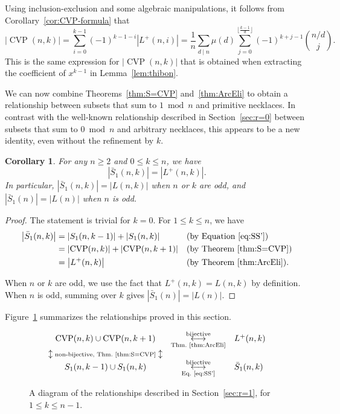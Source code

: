\documentclass[12pt]{article}
\DeclareMathOperator{\CVP}{CVP}
\newcommand{\card}[1]{\left|#1\right|}
\newcommand{\bS}{\bar{S}}
\newtheorem{corollary}[theorem]{Corollary}
\theoremstyle{definition}
\begin{document}
Using inclusion-exclusion and some algebraic manipulations, it follows from Corollary~\ref{cor:CVP-formula} that
$$\card{\CVP(n,k)}=\sum_{i=0}^{k-1}(-1)^{k-1-i}\card{L^+(n,i)}=\frac{1}{n}\sum_{d\mid n}\mu(d)\sum_{j=0}^{\lfloor\frac{k-1}{d}\rfloor}(-1)^{k+j-1}\binom{n/d}{j}.
$$
This is the same expression for $\card{\CVP(n,k)}$ that is obtained when extracting the coefficient of $x^{k-1}$ in Lemma~\ref{lem:thibon}.

We can now combine Theorems~\ref{thm:S=CVP} and~\ref{thm:ArcEli} to obtain a relationship between subsets that sum to $1 \bmod n$ and primitive necklaces. In contrast with the well-known relationship described in Section~\ref{sec:r=0} between subsets that sum to $0 \bmod n$ and arbitrary necklaces, this appears to be a new identity, even without the refinement by $k$.

\begin{corollary}\label{cor:S'1=L}
    For any $n\ge2$ and $0\le k\le n$, we have
    $$\card{\bS_1(n, k)} = \card{L^+(n, k)}.$$
    In particular, $\card{\bS_1(n, k)} = \card{L(n, k)}$ when $n$ or $k$ are odd, and $\card{\bS_1(n)} = \card{L(n)}$ when $n$ is odd.
\end{corollary}

\begin{proof}
The statement is trivial for $k=0$. For $1\le k\le n$, we have
\begin{align*}
    \card{\bS_1(n, k)}&=\card{S_1(n,k-1)}+\card{S_1(n,k)} && \text{(by Equation~\eqref{eq:SS'})}\\
    &=\card{\CVP(n,k)}+\card{\CVP(n,k+1)}  && \text{(by Theorem~\ref{thm:S=CVP})}\\
    &=\card{L^+(n,k)} && \text{(by Theorem~\ref{thm:ArcEli}).}
\end{align*}

When $n$ or $k$ are odd, we use the fact that $L^+(n,k)=L(n,k)$ by definition. When $n$ is odd, summing over $k$ gives $\card{\bS_1(n)} = \card{L(n)}$.
\end{proof}

Figure~\ref{fig:diagram} summarizes the relationships proved in this section.

\begin{figure}[h]
$$\begin{array}{cclc}
\CVP(n,k)\cup\CVP(n,k+1) & \overunderset{\text{bijective}}{\text{Thm.~\ref{thm:ArcEli}}}{\longleftrightarrow} & L^+(n,k)\\
\updownarrow \text{\scriptsize non-bijective, Thm.~\ref{thm:S=CVP}} \updownarrow & &\\
S_1(n,k-1)\cup S_1(n,k) & \overunderset{\text{bijective}}{\text{Eq.~\eqref{eq:SS'}}}{\longleftrightarrow} & \bS_1(n,k)
\end{array}$$
\caption{A diagram of the relationships described in Section~\ref{sec:r=1}, for $1\le k\le n-1$.}
\label{fig:diagram}
\end{figure}
\end{document}
